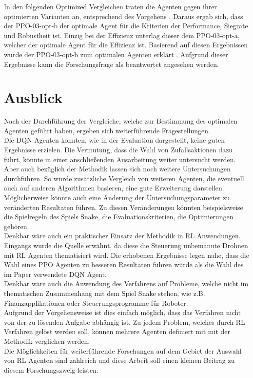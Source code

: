 In den folgenden Optimized Vergleichen traten die Agenten gegen ihrer optimierten Varianten an, entsprechend des Vorgehens .
Daraus ergab sich, dass der PPO-03-opt-b der optimale Agent für die Kriterien der Performance, Siegrate und Robustheit ist. Einzig bei der Effizienz unterlag dieser dem PPO-03-opt-a, welcher der optimale Agent für die Effizienz ist. Basierend auf diesen Ergebnissen wurde der PPO-03-opt-b zum optimalen Agenten erklärt .
Aufgrund dieser Ergebnisse kann die Forschungsfrage als beantwortet angesehen werden.

\section{Ausblick}
Nach der Durchführung der Vergleiche, welche zur Bestimmung des optimalen Agenten geführt haben, ergeben sich weiterführende Fragestellungen.\\
Die DQN Agenten konnten, wie in der Evaluation dargestellt, keine guten Ergebnisse erzielen. Die Vermutung, dass die Wahl von Zufallsaktionen dazu führt, könnte in einer anschließenden Ausarbeitung weiter untersucht werden.\\
Aber auch bezüglich der Methodik lassen sich noch weitere Untersuchungen durchführen. 
So würde zusätzliche Vergleich von weiteren Agenten, die eventuell auch auf anderen Algorithmen basieren, eine gute Erweiterung darstellen.\\
Möglicherweise könnte auch eine Änderung der Untersuchungsparameter zu veränderten Resultaten führen. Zu diesen Veränderungen könnten beispielsweise die Spielregeln des Spiels Snake, die Evaluationskriterien, die Optimierungen gehören.\\
Denkbar wäre auch ein praktischer Einsatz der Methodik in RL Anwendungen. Eingangs wurde die Quelle \cite{UAV} erwähnt, da diese die Steuerung unbemannte Drohnen mit RL Agenten thematisiert wird. Die erhobenen Ergebnisse legen nahe, dass die Wahl eines PPO Agenten zu besseren Resultaten führen würde als die Wahl des im Paper verwendete DQN Agent.\\
Denkbar wäre auch die Anwendung des Verfahrens auf Probleme, welche nicht im thematischen Zusammenhang mit dem Spiel Snake stehen, wie z.B. Finanzapplikationen oder Steuerungsprogramme für Roboter.\\
Aufgrund der Vorgehensweise ist dies einfach möglich, dass das Verfahren nicht von der zu lösenden Aufgabe abhängig ist. Zu jedem Problem, welches durch RL Verfahren gelöst werden soll, können mehrere Agenten definiert mit mit der Methodik verglichen werden.\\
Die Möglichkeiten für weiterführende Forschungen auf dem Gebiet der Auswahl von RL Agenten sind zahlreich und diese Arbeit soll einen kleinen Beitrag zu diesem Forschungszweig leisten.